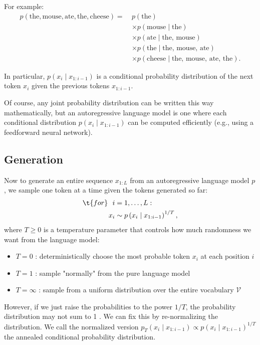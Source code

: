 For example:
\begin{align*}
p(\text{the},\text{mouse},\text{ate},\text{the},\text{cheese}) = ~& p(\text{the}) \\
& \times p(\text{mouse}\mid\text{the}) \\
& \times p(\text{ate}\mid\text{the, mouse}) \\
& \times p(\text{the}\mid\text{the, mouse, ate}) \\
& \times p(\text{cheese}\mid\text{the, mouse, ate, the}) .
\end{align*}


In particular, $p\left(x_i \mid x_{1: i-1}\right)$ is a conditional probability distribution of the next token $x_i$ given the previous tokens $x_{1: i-1}$.

Of course, any joint probability distribution can be written this way mathematically, but an autoregressive language model is one where each conditional distribution $p\left(x_i \mid x_{1: i-1}\right)$ can be computed efficiently (e.g., using a feedforward neural network).

\subsection{Generation}
Now to generate an entire sequence $x_{1: L}$ from an autoregressive language model $p$, we sample one token at a time given the tokens generated so far:
\begin{align*}
\t{for}~~ i & =1, \ldots, L: \\
x_i & \sim p\left(x_i \mid x_{1: i-1}\right)^{1 / T},
\end{align*}
where $T \geq 0$ is a temperature parameter that controls how much randomness we want from the language model:
\begin{itemize}
  \item $T=0$ : deterministically choose the most probable token $x_i$ at each position $i$
  \item $T=1$ : sample "normally" from the pure language model
  \item $T=\infty$ : sample from a uniform distribution over the entire vocabulary $\mathcal{V}$
\end{itemize}


However, if we just raise the probabilities to the power $1 / T$, the probability distribution may not sum to 1 . We can fix this by re-normalizing the distribution. We call the normalized version
$p_T\left(x_i \mid x_{1: i-1}\right) \propto p\left(x_i \mid x_{1: i-1}\right)^{1 / T}$ the annealed conditional probability distribution. 


